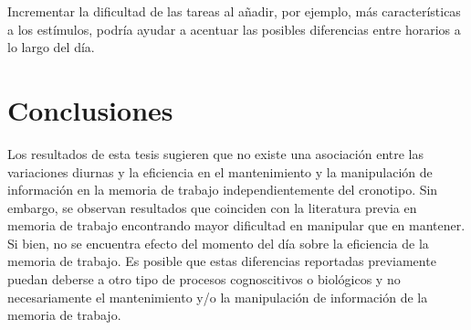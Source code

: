\documentclass[12pt,letterpaper,final]{article}
\begin{document}
Incrementar la dificultad de las tareas al añadir, por ejemplo, más características a los estímulos, podría ayudar a acentuar las posibles diferencias entre horarios a lo largo del día.
 
\section{Conclusiones}


Los resultados de esta tesis sugieren que no existe una asociación entre las variaciones diurnas y la eficiencia en el mantenimiento y la manipulación de información en la memoria de trabajo independientemente del cronotipo. Sin embargo, se observan resultados que coinciden con la literatura previa en memoria de trabajo encontrando mayor dificultad en manipular que en mantener. Si bien, no se encuentra efecto del momento del día sobre la eficiencia de la memoria de trabajo. Es posible que estas diferencias reportadas previamente puedan deberse a otro tipo de procesos cognoscitivos  o biológicos y no necesariamente el mantenimiento y/o la manipulación de información de la memoria de trabajo.

   




\renewcommand{\baselinestretch}{1}



\end{document}
